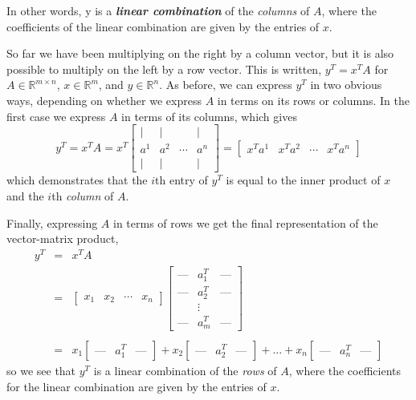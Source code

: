 \documentclass[12pt]{article}
\begin{document}
In other words, y is a \textbf{\textit{linear combination}} of the
\textit{columns} of $A$, where the coefficients of the linear
combination are given by the entries of $x$. 

So far we have been multiplying on the right by a column vector, but
it is also possible to multiply on the left by a row vector.  This is
written, $y^T = x^T A$ for $A \in \mathbb{R}^{m \times n}$, $x \in
\mathbb{R}^m$, and $y \in \mathbb{R}^n$.  As before, we can express
$y^T$ in two obvious ways, depending on whether we express $A$ in
terms on its rows or columns.  In the first case we express $A$ in
terms of its columns, which gives
\[y^T = x^T A = x^T \left [ \begin{array}{cccc} | & | &  & 
  | \\ a^1 & a^2 & \cdots & a^n \\ | & | &  & |
  \end{array} \right ] = \left [
  \begin{array}{cccc} x^T a^1 & x^T a^2 & \cdots & x^T a^n \end{array}
  \right ] \]
which demonstrates that the $i$th entry of $y^T$ is equal to the inner
product of $x$ and the $i$th \textit{column} of $A$.

Finally, expressing $A$ in terms of rows we get the final
representation of the vector-matrix product,
\begin{eqnarray*}
y^T & = & x^T A \\
    & = & \left [ \begin{array}{cccc}x_1 & x_2 & \cdots & x_n 
  \end{array} \right ] \left [ \begin{array}{ccc} \mbox{---} & a^T_1 & 
  \mbox{---} \\   \mbox{---} & a^T_2 &  \mbox{---} \\ & \vdots & \\
  \mbox{---} & a^T_m  &  \mbox{---} \end{array} \right ] \\ & & \\ 
& = & x_1 \left [ \begin{array}{ccc} \mbox{---} & a^T_1 & \mbox{---}
  \end{array} \right ] + x_2 \left [ \begin{array}{ccc} \mbox{---} &
    a^T_2 & \mbox{---} \end{array} \right ] + ... + x_n \left [
    \begin{array}{ccc} \mbox{---} & a^T_n & \mbox{---} \end{array} \right ]
\end{eqnarray*}
so we see that $y^T$ is a linear combination of the \textit{rows} of
$A$, where the coefficients for the linear combination are given by
the entries of $x$.
\end{document}
